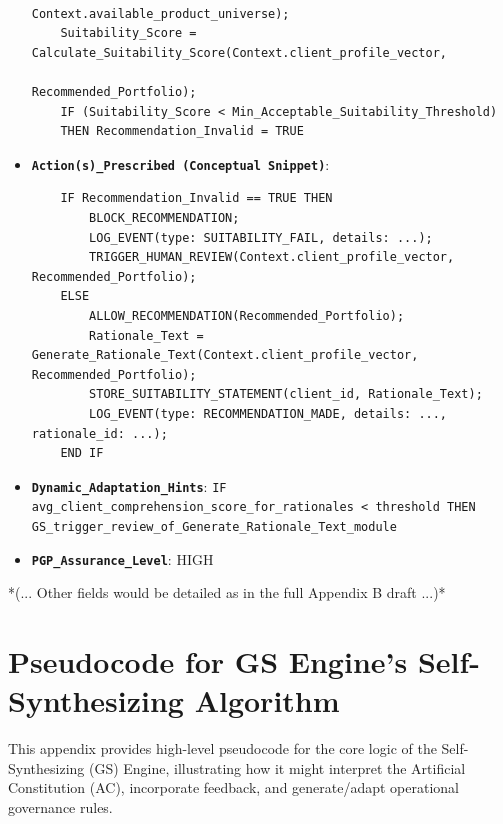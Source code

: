 \documentclass[sigconf,review,anonymous=false]{acmart} %
\begin{document}
\begin{itemize}
\begin{verbatim}
                                           Context.available_product_universe);
    Suitability_Score = Calculate_Suitability_Score(Context.client_profile_vector,
                                                  Recommended_Portfolio);
    IF (Suitability_Score < Min_Acceptable_Suitability_Threshold)
    THEN Recommendation_Invalid = TRUE
    \end{verbatim}
    \item \textbf{\texttt{Action(s)\_Prescribed (Conceptual Snippet)}}:
    \begin{verbatim}
    IF Recommendation_Invalid == TRUE THEN
        BLOCK_RECOMMENDATION;
        LOG_EVENT(type: SUITABILITY_FAIL, details: ...);
        TRIGGER_HUMAN_REVIEW(Context.client_profile_vector, Recommended_Portfolio);
    ELSE
        ALLOW_RECOMMENDATION(Recommended_Portfolio);
        Rationale_Text = Generate_Rationale_Text(Context.client_profile_vector, Recommended_Portfolio);
        STORE_SUITABILITY_STATEMENT(client_id, Rationale_Text);
        LOG_EVENT(type: RECOMMENDATION_MADE, details: ..., rationale_id: ...);
    END IF
    \end{verbatim}
    \item \textbf{\texttt{Dynamic\_Adaptation\_Hints}}: \texttt{IF avg\_client\_comprehension\_score\_for\_rationales < threshold THEN GS\_trigger\_review\_of\_Generate\_Rationale\_Text\_module}
    \item \textbf{\texttt{PGP\_Assurance\_Level}}: HIGH
\end{itemize}
*(... Other fields would be detailed as in the full Appendix B draft ...)*

\section{Pseudocode for GS Engine's Self-Synthesizing Algorithm}
\label{app:gs_pseudocode}
This appendix provides high-level pseudocode for the core logic of the Self-Synthesizing (GS) Engine, illustrating how it might interpret the Artificial Constitution (AC), incorporate feedback, and generate/adapt operational governance rules.
\end{document}
